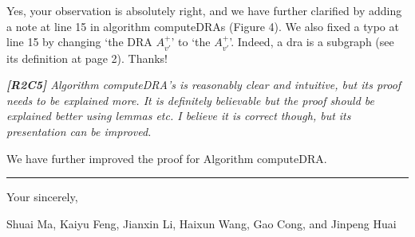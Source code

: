\documentclass[11pt]{letter}
\newcommand{\vs}{\vspace{1ex}}
\newcommand{\svs}{\vspace{0.36ex}}
\newcommand{\dra}{{\sc dra}\xspace}
\begin{document}
Yes, your observation is absolutely right, and we have further clarified by adding a note at line 15 in algorithm computeDRAs (Figure 4).
We also fixed a typo at line 15 by changing `the DRA $A^+_{v'}$' to `the $A^+_{v'}$'. Indeed, a \dra is a subgraph (see its definition at page 2). Thanks!


\vs
\noindent
{\em{\bf[R2C5]} Algorithm computeDRA's is reasonably clear and intuitive, but its proof needs to be explained more. It is definitely believable but the proof should be explained better using lemmas etc. I believe it is correct though, but its presentation can be improved.}
\svs

We have further improved the proof for Algorithm computeDRA.




\vspace{3.6ex}
\hrule
\vspace{3.6ex}
\closing{Your sincerely,}

\vspace{-8ex}
Shuai Ma, Kaiyu Feng, Jianxin Li, Haixun Wang, Gao Cong, and Jinpeng Huai
\end{document}
